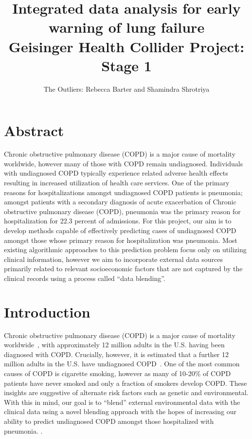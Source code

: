 \documentclass{article}
\title{Integrated data analysis for early warning of lung failure \\ \large{Geisinger Health Collider Project: Stage 1}}
\author{The Outliers: Rebecca Barter and Shamindra Shrotriya}
\begin{document}
\maketitle


\section{Abstract}


Chronic obstructive pulmonary disease (COPD) is a major cause of mortality worldwide, however many of those with COPD remain undiagnosed. Individuals with undiagnosed COPD typically experience related adverse health effects resulting in increased utilization of health care services. One of the primary reasons for hospitalizations amongst undiagnosed COPD patients is pneumonia; amongst patients with a secondary diagnosis of acute exacerbation of Chronic obstructive pulmonary disease (COPD), pneumonia was the primary reason for hospitalization for 22.3 percent of admissions. For this project, our aim is to develop methods capable of effectively predicting cases of undiagnosed COPD amongst those whose primary reason for hospitalization was pneumonia. Most existing algorithmic approaches to this prediction problem focus only on utilizing clinical information, however we aim to incorporate external data sources primarily related to relevant socioeconomic factors that are not captured by the clinical records using a process called ``data blending''. 


\section{Introduction}


Chronic obstructive pulmonary disease (COPD) is a major cause of mortality worldwide~\cite{lozano_global_2012}, with approximately 12 million adults in the U.S. having been diagnosed with COPD. Crucially, however, it is estimated that a further 12 million adults in the U.S. have undiagnosed COPD~\cite{nih_chronic_2010}. One of the most common causes of COPD is cigarette smoking, however as many of 10-20\% of COPD patients have never smoked and only a fraction of smokers develop COPD. These insights are suggestive of alternate risk factors such as genetic and environmental. With this in mind, our goal is to ``blend'' external environmental data with the clinical data using a novel blending approach with the hopes of increasing our ability to predict undiagnosed COPD amongst those hospitalized with pneumonia. . 
\end{document}
